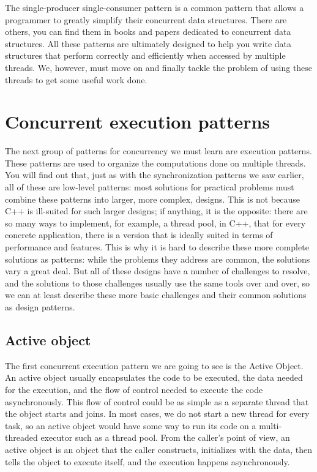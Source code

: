 The single-producer single-consumer pattern is a common pattern that allows a programmer to greatly simplify their concurrent data structures. There are others, you can find them in books and papers dedicated to concurrent data structures. All these patterns are ultimately designed to help you write data structures that perform correctly and efficiently when accessed by multiple threads. We, however, must move on and finally tackle the problem of using these threads to get some useful work done.

\section{Concurrent execution patterns}

The next group of patterns for concurrency we must learn are execution patterns. These patterns are used to organize the computations done on multiple threads. You will find out that, just as with the synchronization patterns we saw earlier, all of these are low-level patterns: most solutions for practical problems must combine these patterns into larger, more complex, designs. This is not because C++ is ill-suited for such larger designs; if anything, it is the opposite: there are so many ways to implement, for example, a thread pool, in C++, that for every concrete application, there is a version that is ideally suited in terms of performance and features. This is why it is hard to describe these more complete solutions as patterns: while the problems they address are common, the solutions vary a great deal. But all of these designs have a number of challenges to resolve, and the solutions to those challenges usually use the same tools over and over, so we can at least describe these more basic challenges and their common solutions as design patterns.

\subsection{Active object}

The first concurrent execution pattern we are going to see is the Active Object. An active object usually encapsulates the code to be executed, the data needed for the execution, and the flow of control needed to execute the code asynchronously. This flow of control could be as simple as a separate thread that the object starts and joins. In most cases, we do not start a new thread for every task, so an active object would have some way to run its code on a multi-threaded executor such as a thread pool. From the caller's point of view, an active object is an object that the caller constructs, initializes with the data, then tells the object to execute itself, and the execution happens asynchronously.

